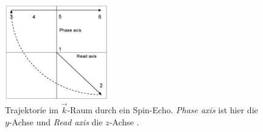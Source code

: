 \documentclass[../main.tex]{subfiles}
\begin{document}
\begin{itemize}
        \begin{figure}[H]
            \centering
            \includegraphics[width=0.4\textwidth]{Bilddateien/GrundlagenMehrdimMRISpinecho.jpg}
            \caption{Trajektorie im $\vec{k}$-Raum durch ein Spin-Echo. \textit{Phase axis} ist hier die $y$-Achse und \textit{Read axis} die $z$-Achse \cite[p.82]{doc:EFNMRStudentManual}.}
            \label{fig:GrundlagenMehrdimMRISpinecho}
        \end{figure}
    \end{itemize}
\end{document}
